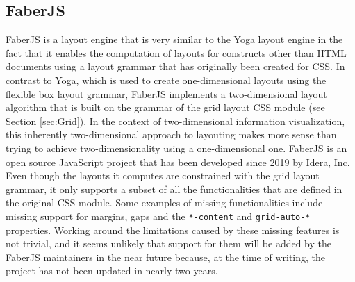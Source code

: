 \subsection{FaberJS}

FaberJS \parencite{FaberJS} is a layout engine that is very similar to the Yoga layout engine in the fact that it enables the computation of layouts for constructs other than HTML documents using a layout grammar that has originally been created for CSS. In contrast to Yoga, which is used to create one-dimensional layouts using the flexible box layout grammar, FaberJS implements a two-dimensional layout algorithm that is built on the grammar of the grid layout CSS module (see Section \ref{sec:Grid}). In the context of two-dimensional information visualization, this inherently two-dimensional approach to layouting makes more sense than trying to achieve two-dimensionality using a one-dimensional one. FaberJS is an open source JavaScript project that has been developed since 2019 by Idera, Inc. Even though the layouts it computes are constrained with the grid layout grammar, it only supports a subset of all the functionalities that are defined in the original CSS module. Some examples of missing functionalities include missing support for margins, gaps and the \lstinline{*-content} and \lstinline{grid-auto-*} properties. Working around the limitations caused by these missing features is not trivial, and it seems unlikely that support for them will be added by the FaberJS maintainers in the near future because, at the time of writing, the project has not been updated in nearly two years. 